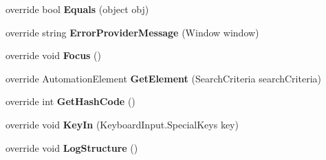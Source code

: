 \begin{DoxyCompactItemize}
\item 
\hypertarget{class_proto_test_1_1_golem_1_1_white_1_1_elements_1_1_white_check_box_a247c7a4e7ef081f5006ad4b13ca7740b}{override bool {\bfseries Equals} (object obj)}\label{class_proto_test_1_1_golem_1_1_white_1_1_elements_1_1_white_check_box_a247c7a4e7ef081f5006ad4b13ca7740b}

\item 
\hypertarget{class_proto_test_1_1_golem_1_1_white_1_1_elements_1_1_white_check_box_a89578a621ecadb38a40f338315ad49c8}{override string {\bfseries Error\-Provider\-Message} (Window window)}\label{class_proto_test_1_1_golem_1_1_white_1_1_elements_1_1_white_check_box_a89578a621ecadb38a40f338315ad49c8}

\item 
\hypertarget{class_proto_test_1_1_golem_1_1_white_1_1_elements_1_1_white_check_box_a8ad626df6ac7c2b53a9d90d265096cbb}{override void {\bfseries Focus} ()}\label{class_proto_test_1_1_golem_1_1_white_1_1_elements_1_1_white_check_box_a8ad626df6ac7c2b53a9d90d265096cbb}

\item 
\hypertarget{class_proto_test_1_1_golem_1_1_white_1_1_elements_1_1_white_check_box_a90dc5e622446c1f8d9118a9987f74daf}{override Automation\-Element {\bfseries Get\-Element} (Search\-Criteria search\-Criteria)}\label{class_proto_test_1_1_golem_1_1_white_1_1_elements_1_1_white_check_box_a90dc5e622446c1f8d9118a9987f74daf}

\item 
\hypertarget{class_proto_test_1_1_golem_1_1_white_1_1_elements_1_1_white_check_box_a9232c72ab5cde189d4c32e3efd132d86}{override int {\bfseries Get\-Hash\-Code} ()}\label{class_proto_test_1_1_golem_1_1_white_1_1_elements_1_1_white_check_box_a9232c72ab5cde189d4c32e3efd132d86}

\item 
\hypertarget{class_proto_test_1_1_golem_1_1_white_1_1_elements_1_1_white_check_box_ae6f348275a66ec7288fad61e8eb8e6e6}{override void {\bfseries Key\-In} (Keyboard\-Input.\-Special\-Keys key)}\label{class_proto_test_1_1_golem_1_1_white_1_1_elements_1_1_white_check_box_ae6f348275a66ec7288fad61e8eb8e6e6}

\item 
\hypertarget{class_proto_test_1_1_golem_1_1_white_1_1_elements_1_1_white_check_box_a4f1d6dbd95744c6b0e3e8ba59f9447ae}{override void {\bfseries Log\-Structure} ()}\label{class_proto_test_1_1_golem_1_1_white_1_1_elements_1_1_white_check_box_a4f1d6dbd95744c6b0e3e8ba59f9447ae}


\end{DoxyCompactItemize}
